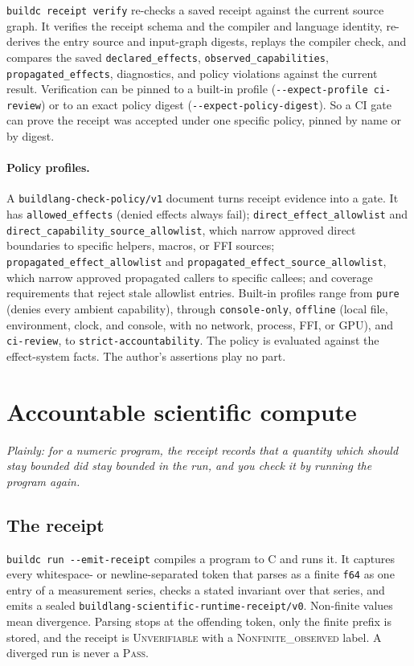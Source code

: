 \documentclass[11pt]{article}
\begin{document}
\texttt{buildc receipt verify} re-checks a saved receipt against the current source graph. It verifies the receipt schema and the compiler and language identity, re-derives the entry source and input-graph digests, replays the compiler check, and compares the saved \texttt{declared\_effects}, \texttt{observed\_capabilities}, \texttt{propagated\_effects}, diagnostics, and policy violations against the current result. Verification can be pinned to a built-in profile (\texttt{-{}-expect-profile ci-review}) or to an exact policy digest (\texttt{-{}-expect-policy-digest}). So a CI gate can prove the receipt was accepted under one specific policy, pinned by name or by digest.

\paragraph{Policy profiles.} A \texttt{buildlang-check-policy/v1} document turns receipt evidence into a gate. It has \texttt{allowed\_effects} (denied effects always fail); \texttt{direct\_effect\_allowlist} and \texttt{direct\_capability\_source\_allowlist}, which narrow approved direct boundaries to specific helpers, macros, or FFI sources; \texttt{propagated\_effect\_allowlist} and \texttt{propagated\_effect\_source\_allowlist}, which narrow approved propagated callers to specific callees; and coverage requirements that reject stale allowlist entries. Built-in profiles range from \texttt{pure} (denies every ambient capability), through \texttt{console-only}, \texttt{offline} (local file, environment, clock, and console, with no network, process, FFI, or GPU), and \texttt{ci-review}, to \texttt{strict-accountability}. The policy is evaluated against the effect-system facts. The author's assertions play no part.

\section{Accountable scientific compute}
\label{sec:sci}
\emph{Plainly: for a numeric program, the receipt records that a quantity which should stay bounded did stay bounded in the run, and you check it by running the program again.}

\subsection{The receipt}

\texttt{buildc run -{}-emit-receipt} compiles a program to C and runs it. It captures every whitespace- or newline-separated token that parses as a finite \texttt{f64} as one entry of a measurement series, checks a stated invariant over that series, and emits a sealed \texttt{buildlang-scientific-runtime-receipt/v0}. Non-finite values mean divergence. Parsing stops at the offending token, only the finite prefix is stored, and the receipt is \textsc{Unverifiable} with a \textsc{Nonfinite\_observed} label. A diverged run is never a \textsc{Pass}.
\end{document}
